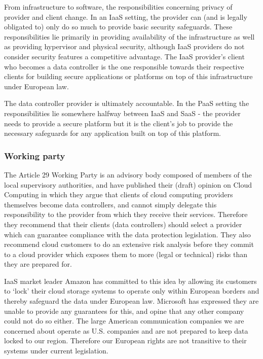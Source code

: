\documentclass[12pt]{article}
\begin{document}
From infrastructure to software, the responsibilities concerning privacy of provider and client change.
In an IaaS setting, the provider can (and is legally obligated to) only do so much to provide basic security safeguards.
These responsibilities lie primarily in providing availability of the infrastructure as well as providing hypervisor and physical security, although IaaS providers do not consider security features a competitive advantage.
The IaaS provider's client who becomes a data controller is the one responsible towards their respective clients for building secure applications or platforms on top of this infrastructure under European law.

The data controller provider is ultimately accountable.
In the PaaS setting the responsibilities lie somewhere halfway between IaaS and SaaS - the provider needs to provide a secure platform but it is the client's job to provide the necessary safeguards for any application built on top of this platform.

\subsubsection{Working party}
The Article 29 Working Party is an advisory body composed of members of the local supervisory authorities, and have published their (draft) opinion on Cloud Computing in which they argue that clients of cloud computing providers themselves become data controllers, and cannot simply delegate this responsibility to the provider from which they receive their services.
Therefore they recommend that their clients (data controllers) should select a provider which can guarantee compliance with the data protection legislation.
They also recommend cloud customers to do an extensive risk analysis before they commit to a cloud provider which exposes them to more (legal or technical) risks than they are prepared for.

IaaS market leader Amazon has committed to this idea by allowing its customers to `lock' their cloud storage systems to operate only within European borders and thereby safeguard the data under European law.
Microsoft has expressed they are unable to provide any guarantees for this, and opine that any other company could not do so either.
The large American communication companies we are concerned about operate as U.S. companies and are not prepared to keep data locked to our region. Therefore our European rights are not transitive to their systems under current legislation.
\end{document}
